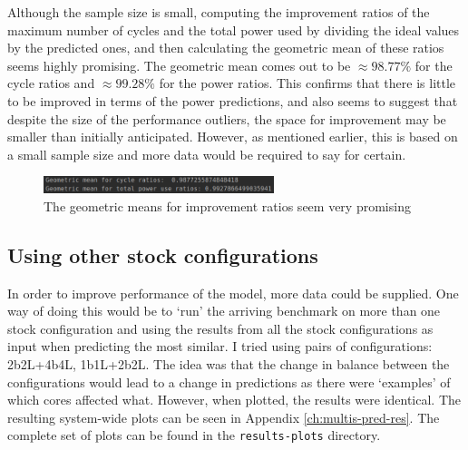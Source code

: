     Although the sample size is small, computing the improvement ratios of the 
    maximum number of cycles and the total power used by dividing the ideal 
    values by the predicted ones, and then calculating the geometric mean of 
    these ratios seems highly promising. The geometric mean comes out to be 
    $\approx 98.77\%$ for the cycle ratios and $\approx 99.28\%$ for the power
    ratios. This confirms that there is little to be improved in terms of the
    power predictions, and also seems to suggest that despite the size of the 
    performance outliers, the space for improvement may be smaller than 
    initially anticipated. However, as mentioned earlier, this is based on a 
    small sample size and more data would be required to say for certain.
    \begin{figure}[H]
        \centering
        \includegraphics[width=0.6\textwidth]{screenshots/promising-geomeans.png}
        \caption{The geometric means for improvement ratios seem very promising}
    \end{figure}
    
    \subsection{Using other stock configurations}
    In order to improve performance of the model, more data could be supplied. 
    One way of doing this would be to `run' the arriving benchmark on more than 
    one stock configuration and using the results from all the stock 
    configurations as input when predicting the most similar. I tried using 
    pairs of configurations: 2b2L+4b4L, 1b1L+2b2L. The idea was that the change 
    in balance between the configurations would lead to a change in predictions 
    as there were `examples' of which cores affected what. However, when 
    plotted, the results were identical. The resulting system-wide plots can be 
    seen in Appendix \ref{ch:multis-pred-res}. The complete set of plots can be 
    found in the \texttt{results-plots} directory.
